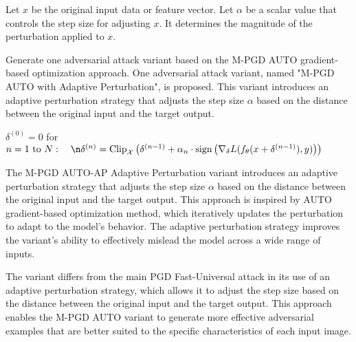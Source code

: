 Let $x$ be the original input data or feature vector. Let $\alpha$ be a scalar value that controls the step size for adjusting $x$. It determines the magnitude of the perturbation applied to $x$.

Generate one adversarial attack variant based on the M-PGD AUTO gradient-based optimization approach. One adversarial attack variant, named "M-PGD AUTO with Adaptive Perturbation", is proposed. This variant introduces an adaptive perturbation strategy that adjusts the step size $\alpha$ based on the distance between the original input and the target output.

$\delta^{(0)} = 0$
for $n = 1 \text{ to } N: \quad\n\delta^{(n)} = \text{Clip}_{\mathcal{X}} \left( \delta^{(n-1)} + \alpha_n \cdot \text{sign} \left( \nabla_\delta L(f_\theta(x + \delta^{(n-1)}), y) \right) \right)$

The M-PGD AUTO-AP Adaptive Perturbation variant introduces an adaptive perturbation strategy that adjusts the step size $\alpha$ based on the distance between the original input and the target output. This approach is inspired by AUTO gradient-based optimization method, which iteratively updates the perturbation to adapt to the model's behavior. The adaptive perturbation strategy improves the variant's ability to effectively mislead the model across a wide range of inputs.

The variant differs from the main PGD Fast-Universal attack in its use of an adaptive perturbation strategy, which allows it to adjust the step size based on the distance between the original input and the target output. This approach enables the M-PGD AUTO variant to generate more effective adversarial examples that are better suited to the specific characteristics of each input image.